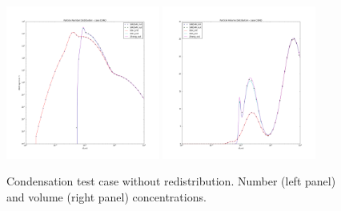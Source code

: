 \documentclass[a4paper,11pt]{article}
\begin{document}
\begin{figure}[H]
        \begin{center}
                \includegraphics[angle=0,width=0.45\textwidth]{../graph/figure_ref/dNdlogd_COND_no_redist.png}
                \includegraphics[angle=0,width=0.45\textwidth]{../graph/figure_ref/dVdlogd_COND_no_redist.png}
        \end{center}
\caption{Condensation test case without redistribution. Number (left panel) and volume (right panel) concentrations.}
\label{fig-cond-noredist}
\end{figure}
       
\end{document}
